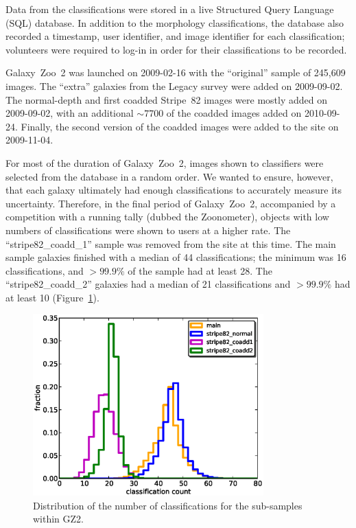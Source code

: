\documentclass[useAMS,usenatbib]{mn2e}
\begin{document}
Data from the classifications were stored in a live Structured Query Language (SQL) database. In addition to the morphology classifications, the database also recorded a timestamp, user identifier, and image identifier for each classification; volunteers were required to log-in in order for their classifications to be recorded. 

Galaxy~Zoo~2 was launched on 2009-02-16 with the ``original'' sample of 245,609 images. The ``extra'' galaxies from the Legacy survey were added on 2009-09-02. The normal-depth and first coadded Stripe~82 images were mostly added on 2009-09-02, with an additional $\sim7700$ of the coadded images added on 2010-09-24. Finally, the second version of the coadded images were added to the site on 2009-11-04. 

For most of the duration of Galaxy~Zoo~2, images shown to classifiers were selected from the database in a random order. We wanted to ensure, however, that each galaxy ultimately had enough classifications to accurately measure its uncertainty. Therefore, in the final period of Galaxy~Zoo~2, accompanied by a competition with a running tally (dubbed the Zoonometer), objects with low numbers of classifications were shown to users at a higher rate. The ``stripe82\_coadd\_1'' sample was removed from the site at this time. The main sample galaxies finished with a median of 44 classifications; the minimum was 16 classifications, and $>99.9\%$ of the sample had at least 28. The ``stripe82\_coadd\_2'' galaxies had a median of 21 classifications and $>99.9\%$ had at least 10 (Figure~\ref{fig-classification_histogram}).

\begin{figure}
\includegraphics[angle=0,width=3.5in]{figures/classification_histogram.eps}
\caption{Distribution of the number of classifications for the sub-samples within GZ2.
\label{fig-classification_histogram}}
\end{figure}
\end{document}
